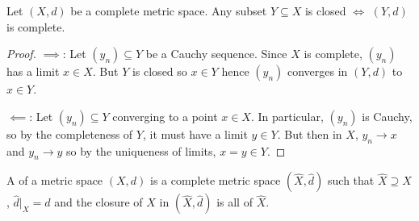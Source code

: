 \documentclass[14pt,oneside]{extarticle}
\begin{document}
\begin{proposition*}
  Let $(X,d)$ be a complete metric space. Any subset $Y \subseteq X$ is closed $\iff$ $(Y,d)$ is complete.
\end{proposition*}
\begin{proof}
  $\implies$: Let $(y_n) \subseteq Y$ be a Cauchy sequence. Since $X$ is complete, $(y_n)$ has a limit $x \in X$. But $Y$ is closed so $x \in Y$ hence $(y_n)$ converges in $(Y,d)$ to $x \in Y$.

  $\impliedby$: Let $(y_n) \subseteq Y$ converging to a point $x \in X$. In particular, $(y_n)$ is Cauchy, so by the completeness of $Y$, it must have a limit $y \in Y$. But then in $X$, $y_n \to x$ and $y_n \to y$ so by the uniqueness of limits, $x = y \in Y$.
\end{proof}

\begin{definition*}
  A  of a metric space $(X,d)$ is a complete metric space $(\hat{X}, \hat{d})$ such that $\hat{X} \supseteq X$, $\hat{d}|_X = d$ and the closure of $X$ in $(\hat{X}, \hat{d})$ is all of $\hat{X}$.
\end{definition*}
\end{document}
